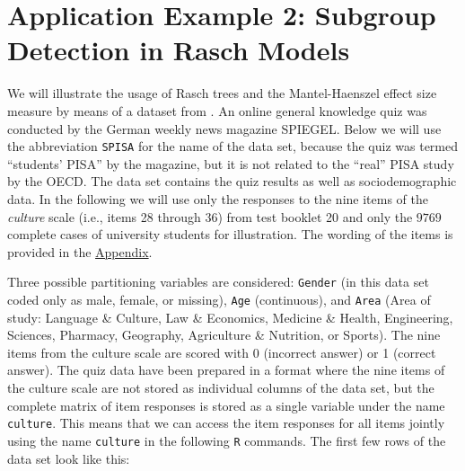\documentclass[doc,floatsintext,natbib]{apa7}
\newcommand{\edc}[1]{\textcolor{blue}{#1}}
\begin{document}






\newpage

\section{Application Example 2: Subgroup Detection in Rasch Models}
\label{sec:TutorialRasch}


We will illustrate the usage of Rasch trees and the Mantel-Haenszel effect size measure by means of a dataset from \citet{SPISA:book}. An online general knowledge quiz was conducted by the German
weekly news magazine SPIEGEL. Below we will use the abbreviation \texttt{SPISA} for the name of the data set, because the quiz was termed ``students' PISA'' by the magazine, but it is not related to the ``real'' PISA study by the OECD. The data set contains the quiz results as well as sociodemographic data. In the following we will use only the responses to the nine items of the \textit{culture} scale (i.e., items 28 through 36) from test booklet 20 and only the $9769$ complete cases of university students for illustration. The wording of the items is provided in the \hyperref[sec:AppendixA]{Appendix}.

Three possible partitioning variables are considered: \texttt{Gender} (in this data set coded only as male, female, or missing), \texttt{Age} (continuous), and \texttt{Area} (Area of study: Language \& Culture, Law \& Economics, Medicine \& Health, Engineering, Sciences, Pharmacy, Geography, Agriculture \& Nutrition, or Sports). The nine items from the culture scale are scored with 0 (incorrect answer) or 1 (correct answer). 
The quiz data have been prepared in a format where the nine items of the culture scale are not stored as individual columns of the data set, but the complete matrix of item responses is stored as a single variable \citep[see][]{raschtree:vignette} under the name \texttt{culture}. This means that we can access the item responses for all items jointly using the name \texttt{culture} in the following \texttt{R} commands. The first few rows of the data set look like this:
\end{document}
